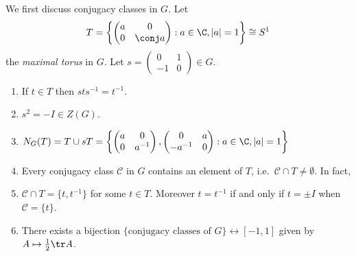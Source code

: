 \documentclass[a4paper]{article}
\newcommand{\ccl}{{\mathcal C}} %
\theoremstyle{definition}
\begin{document}
We first discuss conjugacy classes in \(G\). Let
\[
  T = \left\{
    \begin{pmatrix}
      a & 0 \\
      0 & \conj a
    \end{pmatrix}
    :a \in \C, |a| = 1 \right\} \cong S^1
\]
the \emph{maximal torus} in \(G\). Let \(s =
\begin{pmatrix}
  0 & 1 \\
  -1 & 0
\end{pmatrix}
\in G
\).

\begin{lemma}\leavevmode
  \begin{enumerate}
  \item If \(t \in T\) then \(sts^{-1} = t^{-1}\).
  \item \(s^2 = -I \in Z(G)\).
  \item \(N_G(T) = T \cup sT = \left\{
      \begin{pmatrix}
        a & 0 \\
        0 & a^{-1}
      \end{pmatrix},
      \begin{pmatrix}
        0 & a \\
        -a^{-1} & 0
      \end{pmatrix}
      : a \in \C, |a| = 1\right\}
    \)
  \item Every conjugacy class \(\ccl\) in \(G\) contains an element of \(T\), i.e.\ \(\ccl \cap T \neq \emptyset\). In fact,
  \item \(\ccl \cap T = \{t, t^{-1}\}\) for some \(t \in T\). Moreover \(t = t^{-1}\) if and only if \(t = \pm I\) when \(\ccl = \{t\}\).
  \item There exists a bijection \(\{\text{conjugacy classes of } G\} \leftrightarrow [-1, 1]\) given by \(A \mapsto \frac{1}{2} \tr A\).
  \end{enumerate}
\end{lemma}
\end{document}
